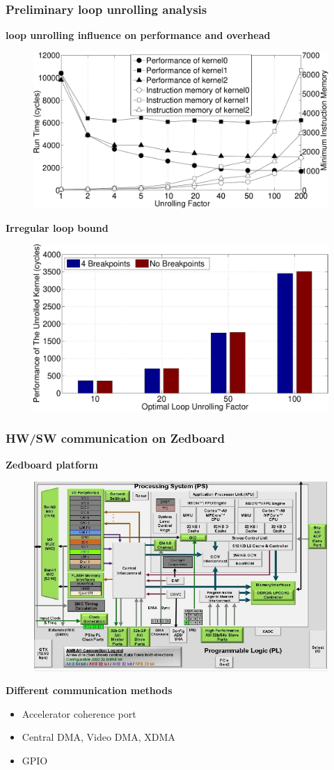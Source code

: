 \documentclass{beamer}
\begin{document}
\begin{frame}[t]
\frametitle{Preliminary loop unrolling analysis}
\vspace{-1em}
\textbf{loop unrolling influence on performance and overhead}
\begin{figure}
\vspace{-1em}
\includegraphics[width=0.6\linewidth]{loop-unrolling}
\vspace{-1em}
\end{figure}

\textbf{Irregular loop bound}
\begin{figure}
\vspace{-1em}
\includegraphics[width=0.6\linewidth]{any-loop-unrolling}
\vspace{-1em}
\end{figure}
\end{frame}

\begin{frame}[t]
\frametitle{HW/SW communication on Zedboard}

\textbf{Zedboard platform}
\begin{figure}
\includegraphics[width=0.7\linewidth]{zynq}
\end{figure}
\textbf{Different communication methods}
\begin{itemize}
\item Accelerator coherence port
\item Central DMA, Video DMA, XDMA
\item GPIO
\end{itemize}

\end{frame}
\end{document}
